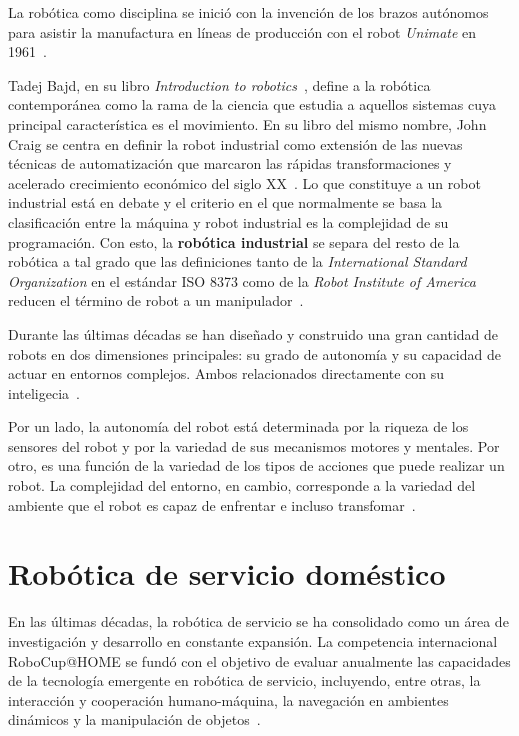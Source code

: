 La robótica como disciplina se inició con la invención de los brazos autónomos para asistir la manufactura en líneas de producción con el robot \emph{Unimate} en 1961~\cite{yazmin_intro}.

Tadej Bajd, en su libro \emph{Introduction to robotics}~\cite{bajd_introRobotics}, define a la robótica contemporánea como la rama de la ciencia que estudia a aquellos sistemas cuya principal característica es el movimiento. En su libro del mismo nombre, John Craig se centra en definir la robot industrial como extensión de las nuevas técnicas de automatización que marcaron las rápidas transformaciones y acelerado crecimiento económico del siglo XX~\cite{craig_introRobotics}. Lo que constituye a un robot industrial está en debate y el criterio en el que normalmente se basa la clasificación entre la máquina y robot industrial es la complejidad de su programación. Con esto, la \textbf{robótica industrial} se separa del resto de la robótica a tal grado que las definiciones tanto de la \emph{International Standard Organization} en el estándar ISO 8373 como de la \emph{Robot Institute of America} reducen el término de robot a un manipulador~\cite{yazmin_robotsServicio}.

Durante las últimas décadas se han diseñado y construido una gran cantidad de robots en dos dimensiones principales: su grado de autonomía y su capacidad de actuar en entornos complejos. Ambos relacionados directamente con su inteligecia~\cite{yazmin_intro}.

Por un lado, la autonomía del robot está determinada por la riqueza de los sensores del robot y por la variedad de sus mecanismos motores y mentales. Por otro, es una función de la variedad de los tipos de acciones que puede realizar un robot. La complejidad del entorno, en cambio, corresponde a la variedad del ambiente que el robot es capaz de enfrentar e incluso transfomar~\cite{yazmin_intro}.

\section{Robótica de servicio doméstico}

En las últimas décadas, la robótica de servicio se ha consolidado como un área de investigación y desarrollo en constante expansión. La competencia internacional RoboCup@HOME se fundó con el objetivo de evaluar anualmente las capacidades de la tecnología emergente en robótica de servicio, incluyendo, entre otras, la interacción y cooperación humano-máquina, la navegación en ambientes dinámicos y la manipulación de objetos~\cite{robocup_athome}.


